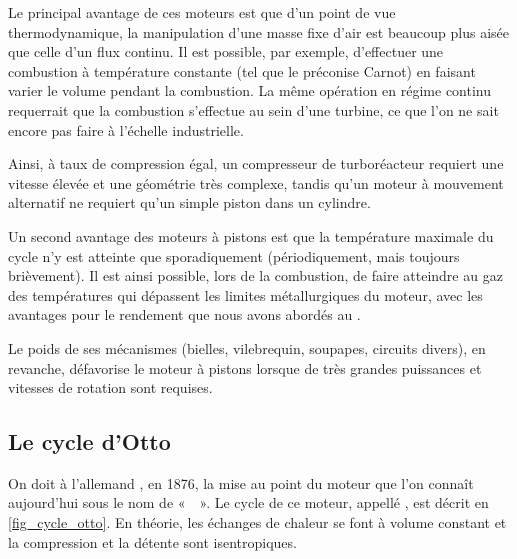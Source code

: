 		Le principal avantage de ces moteurs est que d’un point de vue thermodynamique, la manipulation d’une masse fixe d’air est beaucoup plus aisée que celle d’un flux continu. Il est possible, par exemple, d’effectuer une combustion à température constante (tel que le préconise Carnot) en faisant varier le volume pendant la combustion. La même opération en régime continu requerrait que la combustion s’ef\-fec\-tue au sein d’une turbine, ce que l’on ne sait encore pas faire à l’échelle industrielle.

		Ainsi, à taux de compression égal, un compresseur de turboréacteur requiert une vitesse élevée et une géométrie très complexe, tandis qu’un moteur à mouvement alternatif ne requiert qu’un simple piston dans un cylindre.

		Un second avantage des moteurs à pistons est que la température maximale du cycle n’y est atteinte que sporadiquement (périodiquement, mais toujours brièvement). Il est ainsi possible, lors de la combustion, de faire atteindre au gaz des températures qui dépassent les limites métallurgiques du moteur, avec les avantages pour le rendement que nous avons abordés au \courssept.

		Le poids de ses mécanismes (bielles, vilebrequin, soupapes, circuits divers), en revanche, défavorise le moteur à pistons lorsque de très grandes puissances et vitesses de rotation sont requises.



	\subsection{Le cycle d’Otto}

		On doit à l’allemand , en 1876, la mise au point du moteur que l’on connaît aujourd’hui sous le nom de «~~». Le cycle de ce moteur, appellé , est décrit en \cref{fig_cycle_otto}. En théorie, les échanges de chaleur se font à volume constant et la compression et la détente sont isentropiques.

